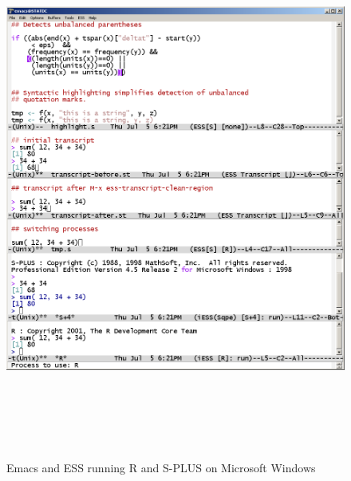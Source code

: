 \documentclass{article}
\begin{document}
\begin{figure}[htbp]
  \begin{center}
    \includegraphics[height=7.0in,width=6.0in]{images/ess-ntemacs-fig-1}
    \caption{Emacs and ESS running R and S-PLUS on Microsoft Windows}
    \label{fig:2}
  \end{center}
\end{figure}
\end{document}

